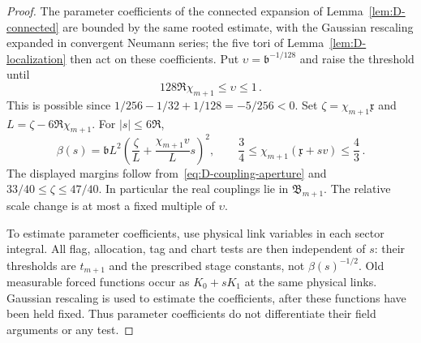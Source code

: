 \begin{proof}
The parameter coefficients of the connected expansion of Lemma~\ref{lem:D-connected} are bounded by the same rooted estimate, with the Gaussian rescaling expanded in convergent Neumann series; the five tori of Lemma~\ref{lem:D-localization} then act on these coefficients. Put $\upsilon=\mathfrak b^{-1/128}$ and raise the threshold until
\begin{equation}\label{eq:D-coupling-aperture}
128\mathfrak R\chi_{m+1}\le\upsilon\le1\,.
\end{equation}
This is possible since $1/256-1/32+1/128=-5/256<0$. Set $\zeta=\chi_{m+1}\mathfrak x$ and $L=\zeta-6\mathfrak R\chi_{m+1}$. For $|s|\le6\mathfrak R$,
\begin{equation*}
\beta(s)=\mathfrak b L^2\left(\frac{\zeta}{L}+\frac{\chi_{m+1}v}{L}s\right)^2,
\qquad \frac34\le\chi_{m+1}(\mathfrak x+sv)\le\frac43\,.
\end{equation*}
The displayed margins follow from~\eqref{eq:D-coupling-aperture} and $33/40\le\zeta\le47/40$. In particular the real couplings lie in $\mathfrak B_{m+1}$. The relative scale change is at most a fixed multiple of $\upsilon$.

To estimate parameter coefficients, use physical link variables in each sector integral. All flag, allocation, tag and chart tests are then independent of $s$: their thresholds are $t_{m+1}$ and the prescribed stage constants, not $\beta(s)^{-1/2}$. Old measurable forced functions occur as $K_0+sK_1$ at the same physical links. Gaussian rescaling is used to estimate the coefficients, after these functions have been held fixed. Thus parameter coefficients do not differentiate their field arguments or any test.


\end{proof}
